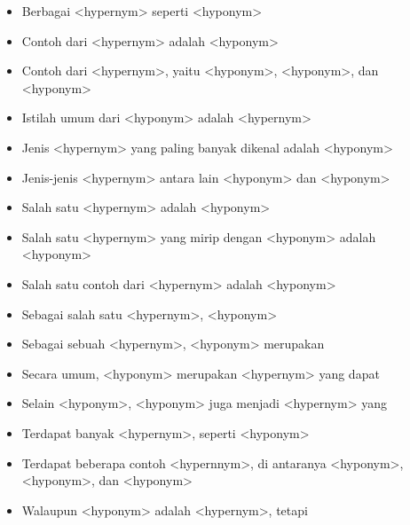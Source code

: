 \begin{itemize}
  \item Berbagai <hypernym> seperti <hyponym>
  \item Contoh dari <hypernym> adalah <hyponym>
  \item Contoh dari <hypernym>, yaitu <hyponym>, <hyponym>, dan <hyponym>
  \item Istilah umum dari <hyponym> adalah <hypernym>
  \item Jenis <hypernym> yang paling banyak dikenal adalah <hyponym>
  \item Jenis-jenis <hypernym> antara lain <hyponym> dan <hyponym>
  \item Salah satu <hypernym> adalah <hyponym>
  \item Salah satu <hypernym> yang mirip dengan <hyponym> adalah <hyponym>
  \item Salah satu contoh dari <hypernym> adalah <hyponym>
  \item Sebagai salah satu <hypernym>, <hyponym>
  \item Sebagai sebuah <hypernym>, <hyponym> merupakan
  \item Secara umum, <hyponym> merupakan <hypernym> yang dapat
  \item Selain <hyponym>, <hyponym> juga menjadi <hypernym> yang
  \item Terdapat banyak <hypernym>, seperti <hyponym>
  \item Terdapat beberapa contoh <hypernnym>, di antaranya <hyponym>, <hyponym>, dan <hyponym>
  \item Walaupun <hyponym> adalah <hypernym>, tetapi 
\end{itemize}








